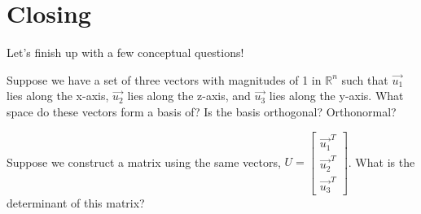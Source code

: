 \documentclass[11pt]{exam}
\begin{document}
\pagebreak
\section{Closing}
Let's finish up with a few conceptual questions!
\begin{questions}
    \item Suppose we have a set of three vectors with magnitudes of 1 in $\mathbb{R}^n$ such that $\vec{u_1}$ lies along the x-axis,
    $\vec{u_2}$ lies along the z-axis, and $\vec{u_3}$ lies along the y-axis. What space do these vectors form a basis of?
    Is the basis orthogonal? Orthonormal?
    \item Suppose we construct a matrix using the same vectors, $U = \begin{bmatrix} \vec{u_1}^T \\ \vec{u_2}^T \\ \vec{u_3}^T \end{bmatrix}$. What
    is the determinant of this matrix?
\end{questions}
\end{document}
